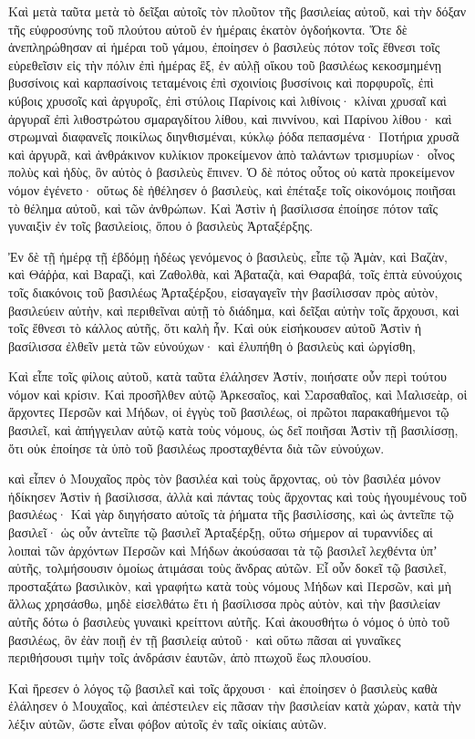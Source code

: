 {\par }{\PP {}Καὶ μετὰ ταῦτα μετὰ τὸ δεῖξαι αὐτοῖς τὸν πλοῦτον τῆς βασιλείας αὐτοῦ, καὶ τὴν δόξαν τῆς εὐφροσύνης τοῦ πλούτου αὐτοῦ ἐν ἡμέραις ἑκατὸν ὀγδοήκοντα.
Ὅτε δὲ ἀνεπληρώθησαν αἱ ἡμέραι τοῦ γάμου, ἐποίησεν ὁ βασιλεὺς πότον τοῖς ἔθνεσι τοῖς εὑρεθεῖσιν εἰς τὴν πόλιν ἐπὶ ἡμέρας ἓξ, ἐν αὐλῇ οἴκου τοῦ βασιλέως
κεκοσμημένῃ βυσσίνοις καὶ καρπασίνοις τεταμένοις ἐπὶ σχοινίοις βυσσίνοις καὶ πορφυροῖς, ἐπὶ κύβοις χρυσοῖς καὶ ἀργυροῖς, ἐπὶ στύλοις Παρίνοις καὶ λιθίνοις· κλίναι χρυσαῖ καὶ ἀργυραῖ ἐπὶ λιθοστρώτου σμαραγδίτου λίθου, καὶ πιννίνου, καὶ Παρίνου λίθου· καὶ στρωμναὶ διαφανεῖς ποικίλως διηνθισμέναι, κύκλῳ ῥόδα πεπασμένα·
Ποτήρια χρυσᾶ καὶ ἀργυρᾶ, καὶ ἀνθράκινον κυλίκιον προκείμενον ἀπὸ ταλάντων τρισμυρίων· οἶνος πολὺς καὶ ἡδὺς, ὃν αὐτὸς ὁ βασιλεὺς ἔπινεν.
Ὁ δὲ πότος οὗτος οὐ κατὰ προκείμενον νόμον ἐγένετο· οὕτως δὲ ἠθέλησεν ὁ βασιλεὺς, καὶ ἐπέταξε τοῖς οἰκονόμοις ποιῆσαι τὸ θέλημα αὐτοῦ, καὶ τῶν ἀνθρώπων.
Καὶ Ἀστὶν ἡ βασίλισσα ἐποίησε πότον ταῖς γυναιξὶν ἐν τοῖς βασιλείοις, ὅπου ὁ βασιλεὺς Ἀρταξέρξης.
\par }{\PP {}Ἐν δὲ τῇ ἡμέρᾳ τῇ ἑβδόμῃ ἡδέως γενόμενος ὁ βασιλεὺς, εἶπε τῷ Ἀμὰν, καὶ Βαζὰν, καὶ Θάῤῥα, καὶ Βαραζὶ, καὶ Ζαθολθὰ, καὶ Ἀβαταζὰ, καὶ Θαραβά, τοῖς ἑπτὰ εὐνούχοις τοῖς διακόνοις τοῦ βασιλέως Ἀρταξέρξου,
εἰσαγαγεῖν τὴν βασίλισσαν πρὸς αὐτὸν, βασιλεύειν αὐτὴν, καὶ περιθεῖναι αὐτῇ τὸ διάδημα, καὶ δεῖξαι αὐτὴν τοῖς ἄρχουσι, καὶ τοῖς ἔθνεσι τὸ κάλλος αὐτῆς, ὅτι καλὴ ἦν.
Καὶ οὐκ εἰσήκουσεν αὐτοῦ Ἀστὶν ἡ βασίλισσα ἐλθεῖν μετὰ τῶν εὐνούχων· καὶ ἐλυπήθη ὁ βασιλεὺς καὶ ὠργίσθη,
\par }{\PP {}Καὶ εἶπε τοῖς φίλοις αὐτοῦ, κατὰ ταῦτα ἐλάλησεν Ἀστίν, ποιήσατε οὖν περὶ τούτου νόμον καὶ κρίσιν.
Καὶ προσῆλθεν αὐτῷ Ἀρκεσαῖος, καὶ Σαρσαθαῖος, καὶ Μαλισεὰρ, οἱ ἄρχοντες Περσῶν καὶ Μήδων, οἱ ἐγγὺς τοῦ βασιλέως, οἱ πρῶτοι παρακαθήμενοι τῷ βασιλεῖ,
καὶ ἀπήγγειλαν αὐτῷ κατὰ τοὺς νόμους, ὡς δεῖ ποιῆσαι Ἀστὶν τῇ βασιλίσσῃ, ὅτι οὐκ ἐποίησε τὰ ὑπὸ τοῦ βασιλέως προσταχθέντα διὰ τῶν εὐνούχων.
\par }{\PP {}καὶ εἶπεν ὁ Μουχαῖος πρὸς τὸν βασιλέα καὶ τοὺς ἄρχοντας, οὐ τὸν βασιλέα μόνον ἠδίκησεν Ἀστὶν ἡ βασίλισσα, ἀλλὰ καὶ πάντας τοὺς ἄρχοντας καὶ τοὺς ἡγουμένους τοῦ βασιλέως·
Καὶ γὰρ διηγήσατο αὐτοῖς τὰ ῥήματα τῆς βασιλίσσης, καὶ ὡς ἀντεῖπε τῷ βασιλεῖ· ὡς οὖν ἀντεῖπε τῷ βασιλεῖ Ἀρταξέρξῃ,
οὕτω σήμερον αἱ τυραννίδες αἱ λοιπαὶ τῶν ἀρχόντων Περσῶν καὶ Μήδων ἀκούσασαι τὰ τῷ βασιλεῖ λεχθέντα ὑπʼ αὐτῆς, τολμήσουσιν ὁμοίως ἀτιμάσαι τοὺς ἄνδρας αὐτῶν.
Εἶ οὖν δοκεῖ τῷ βασιλεῖ, προσταξάτω βασιλικὸν, καὶ γραφήτω κατὰ τοὺς νόμους Μήδων καὶ Περσῶν, καὶ μὴ ἄλλως χρησάσθω, μηδὲ εἰσελθάτω ἔτι ἡ βασίλισσα πρὸς αὐτὸν, καὶ τὴν βασιλείαν αὐτῆς δότω ὁ βασιλεὺς γυναικὶ κρείττονι αὐτῆς.
Καὶ ἀκουσθήτω ὁ νόμος ὁ ὑπὸ τοῦ βασιλέως, ὃν ἐὰν ποιῇ ἐν τῇ βασιλείᾳ αὐτοῦ· καὶ οὕτω πᾶσαι αἱ γυναῖκες περιθήσουσι τιμὴν τοῖς ἀνδράσιν ἑαυτῶν, ἀπὸ πτωχοῦ ἕως πλουσίου.
\par }{\PP {}Καὶ ἤρεσεν ὁ λόγος τῷ βασιλεῖ καὶ τοῖς ἄρχουσι· καὶ ἐποίησεν ὁ βασιλεὺς καθὰ ἐλάλησεν ὁ Μουχαῖος,
καὶ ἀπέστειλεν εἰς πᾶσαν τὴν βασιλείαν κατὰ χώραν, κατὰ τὴν λέξιν αὐτῶν, ὥστε εἶναι φόβον αὐτοῖς ἐν ταῖς οἰκίαις αὐτῶν.

}
